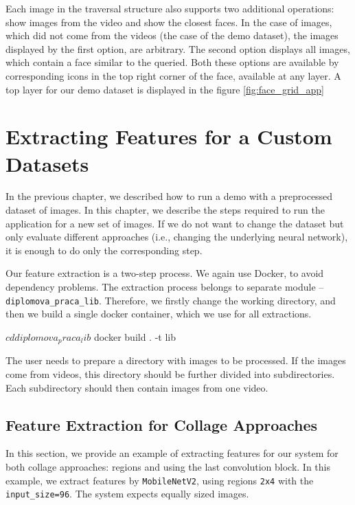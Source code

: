 Each image in the traversal structure also supports two additional operations: show images from the video and show the closest faces. In the case of images, which did not come from the videos (the case of the demo dataset), the images displayed by the first option, are arbitrary. The second option displays all images, which contain a face similar to the queried. Both these options are available by corresponding icons in the top right corner of the face, available at any layer. A top layer for our demo dataset is displayed in the figure \ref{fig:face_grid_app}


\chapter{Extracting Features for a Custom Datasets}
\label{ch:custom_dataset}

In the previous chapter, we described how to run a demo with a preprocessed dataset of images. In this chapter, we describe the steps required to run the application for a new set of images. If we do not want to change the dataset but only evaluate different approaches (i.e., changing the underlying neural network), it is enough to do only the corresponding step.

Our feature extraction is a two-step process. We again use Docker, to avoid dependency problems. The extraction process belongs to separate module -- \verb+diplomova_praca_lib+. Therefore, we firstly change the working directory, and then we build a single docker container, which we use for all extractions.

\vspace{0.5cm}
\begin{boxedverbatim}
$ cd diplomova_praca_lib
$ docker build . -t lib
\end{boxedverbatim}
\vspace{0.5cm}

The user needs to prepare a directory with images to be processed. If the images come from videos, this directory should be further divided into subdirectories. Each subdirectory should then contain images from one video.

\section{Feature Extraction for Collage Approaches}

In this section, we provide an example of extracting features for our system for both collage approaches: regions and using the last convolution block. In this example, we extract features by \verb+MobileNetV2+, using regions \verb+2x4+ with the \verb+input_size=96+. The system expects equally sized images.

